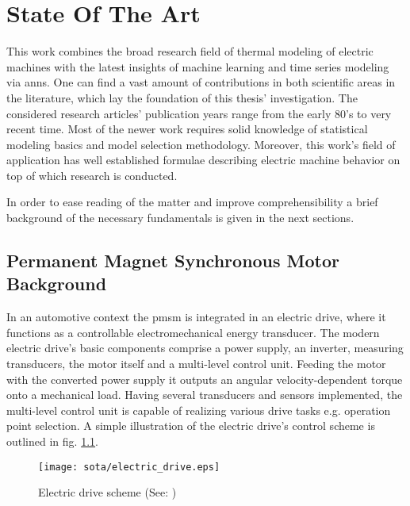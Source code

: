 \chapter{State Of The Art} 
\label{cha:sota}
This work combines the broad research field of thermal modeling of electric machines with the latest insights of machine learning and time series modeling via \glspl{ann}.
One can find a vast amount of contributions in both scientific areas in the literature, which lay the foundation of this thesis' investigation.
The considered research articles' publication years range from the early 80's to very recent time.
Most of the newer work requires solid knowledge of statistical modeling basics and model selection methodology.
Moreover, this work's field of application has well established formulae describing electric machine behavior on top of which research is conducted.

In order to ease reading of the matter and improve comprehensibility a brief background of the necessary fundamentals is given in the next sections.  
 
\section{Permanent Magnet Synchronous Motor Background}
\label{sec:pmsm}
In an automotive context the \gls{pmsm} is integrated in an electric drive, where it functions as a controllable electromechanical energy transducer.
The modern electric drive's basic components comprise a power supply, an inverter, measuring transducers, the motor itself and a multi-level control unit.
Feeding the motor with the converted power supply it outputs an angular velocity-dependent torque onto a mechanical load.
Having several transducers and sensors implemented, the multi-level control unit is capable of realizing various drive tasks e.g. operation point selection.
A simple illustration of the electric drive's control scheme is outlined in fig. \ref{fig:edrive}.
\begin{figure}
	\centering
         \texttt{[image: sota/electric\_drive.eps]}
         \caption{Electric drive scheme (See: \cite{Boecker2016})}
         \label{fig:edrive}
\end{figure}

